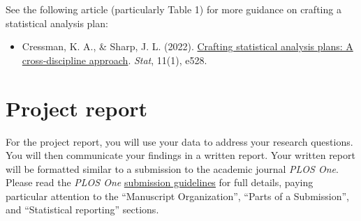 \documentclass[11pt]{article}
\begin{document}
\noindent See the following article (particularly Table 1) for more guidance on crafting a statistical analysis plan:

\begin{itemize}
\item[] Cressman, K. A., \& Sharp, J. L. (2022). \href{https://onlinelibrary.wiley.com/doi/full/10.1002/sta4.528}{Crafting statistical analysis plans: A cross‐discipline approach}. \textit{Stat}, 11(1), e528.
\end{itemize}

\section*{Project report}

For the project report, you will use your data to address your research questions. You will then communicate your findings in a written report. Your written report will be formatted similar to a submission to the academic journal \textit{PLOS One}. Please read the \textit{PLOS One} \href{https://journals.plos.org/plosone/s/submission-guidelines}{\underline{submission guidelines}} for full details, paying particular attention to the ``Manuscript Organization'', ``Parts of a Submission'', and ``Statistical reporting'' sections.\\
\end{document}
